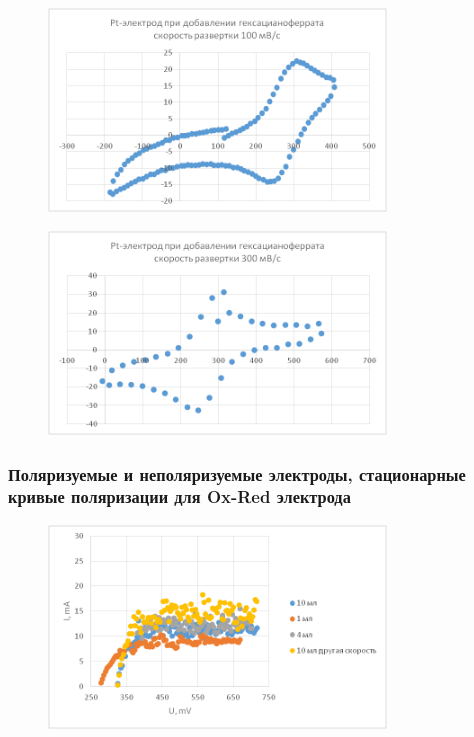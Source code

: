 \documentclass[a4paper, 12pt]{article}
\begin{document}
\begin{figure}[h!]
	\centering
	\caption{}	\includegraphics[width=0.8\textwidth]{image010.png}
\end{figure}


\begin{figure}[h!]
	\centering
	\caption{}	\includegraphics[width=0.8\textwidth]{image012.png}
\end{figure}

\newpage

\subsubsection*{Поляризуемые и неполяризуемые электроды, стационарные кривые поляризации для Ox-Red электрода}


\begin{figure}[h!]
	\centering
	\caption{}	\includegraphics[width=0.8\textwidth]{image014.png}
\end{figure}
\end{document}
